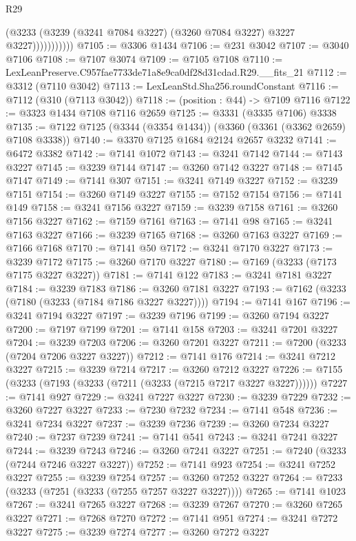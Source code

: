 \begin{lexlean}{R29}
\begin{coremodule}
                      (@3233 (@3239 (@3241 @7084 @3227) (@3260 @7084 @3227) @3227 @3227)))))))))))
@7105 := @3306 @1434
@7106 := @231 @3042
@7107 := @3040 @7106
@7108 := @7107 @3074
@7109 := @7105 @7108
@7110 := LexLeanPreserve.C957fae7733de71a8e9ca0df28d31cdad.R29.__fits_21
@7112 := @3312 (@7110 @3042)
@7113 := LexLeanStd.Sha256.roundConstant
@7116 := @7112 (@310 (@7113 @3042))
@7118 := (position : @44) -> @7109 @7116
@7122 := @3323 @1434 @7108 @7116 @2659
@7125 := @3331 (@3335 @7106) @3338
@7135 := @7122 @7125 (@3344 (@3354 @1434)) (@3360 (@3361 (@3362 @2659) @7108 @3338))
@7140 := @3370 @7125 @1684 @2124 @2657 @3232
@7141 := @6472 @3382
@7142 := @7141 @1072
@7143 := @3241 @7142
@7144 := @7143 @3227
@7145 := @3239 @7144
@7147 := @3260 @7142 @3227
@7148 := @7145 @7147
@7149 := @7141 @307
@7151 := @3241 @7149 @3227
@7152 := @3239 @7151
@7154 := @3260 @7149 @3227
@7155 := @7152 @7154
@7156 := @7141 @149
@7158 := @3241 @7156 @3227
@7159 := @3239 @7158
@7161 := @3260 @7156 @3227
@7162 := @7159 @7161
@7163 := @7141 @98
@7165 := @3241 @7163 @3227
@7166 := @3239 @7165
@7168 := @3260 @7163 @3227
@7169 := @7166 @7168
@7170 := @7141 @50
@7172 := @3241 @7170 @3227
@7173 := @3239 @7172
@7175 := @3260 @7170 @3227
@7180 := @7169 (@3233 (@7173 @7175 @3227 @3227))
@7181 := @7141 @122
@7183 := @3241 @7181 @3227
@7184 := @3239 @7183
@7186 := @3260 @7181 @3227
@7193 := @7162 (@3233 (@7180 (@3233 (@7184 @7186 @3227 @3227))))
@7194 := @7141 @167
@7196 := @3241 @7194 @3227
@7197 := @3239 @7196
@7199 := @3260 @7194 @3227
@7200 := @7197 @7199
@7201 := @7141 @158
@7203 := @3241 @7201 @3227
@7204 := @3239 @7203
@7206 := @3260 @7201 @3227
@7211 := @7200 (@3233 (@7204 @7206 @3227 @3227))
@7212 := @7141 @176
@7214 := @3241 @7212 @3227
@7215 := @3239 @7214
@7217 := @3260 @7212 @3227
@7226 := @7155 (@3233 (@7193 (@3233 (@7211 (@3233 (@7215 @7217 @3227 @3227))))))
@7227 := @7141 @927
@7229 := @3241 @7227 @3227
@7230 := @3239 @7229
@7232 := @3260 @7227 @3227
@7233 := @7230 @7232
@7234 := @7141 @548
@7236 := @3241 @7234 @3227
@7237 := @3239 @7236
@7239 := @3260 @7234 @3227
@7240 := @7237 @7239
@7241 := @7141 @541
@7243 := @3241 @7241 @3227
@7244 := @3239 @7243
@7246 := @3260 @7241 @3227
@7251 := @7240 (@3233 (@7244 @7246 @3227 @3227))
@7252 := @7141 @923
@7254 := @3241 @7252 @3227
@7255 := @3239 @7254
@7257 := @3260 @7252 @3227
@7264 := @7233 (@3233 (@7251 (@3233 (@7255 @7257 @3227 @3227))))
@7265 := @7141 @1023
@7267 := @3241 @7265 @3227
@7268 := @3239 @7267
@7270 := @3260 @7265 @3227
@7271 := @7268 @7270
@7272 := @7141 @951
@7274 := @3241 @7272 @3227
@7275 := @3239 @7274
@7277 := @3260 @7272 @3227

\end{coremodule}
\end{lexlean}

